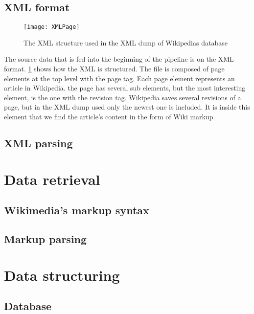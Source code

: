 \subsection{XML format}
\begin{figure}[h]
\caption{The XML structure used in the XML dump of Wikipedias database}
\texttt{[image: XMLPage]}
\label{fig:xml}
\end{figure}

The source data that is fed into the beginning of the pipeline is on the XML format. \ref{fig:xml} shows how the XML is structured. The file is composed of page elements at the top level with the page tag. Each page element represents an article in Wikipedia. the page has several sub elements, but the most interesting element, is the one with the revision tag. Wikipedia saves several revisions of a page, but in the XML dump used only the newest one is included. It is inside this element that we find the article's content in the form of Wiki markup.


\subsection{XML parsing}


\section{Data retrieval}

\subsection{Wikimedia's markup syntax}


\subsection{Markup parsing}


\section{Data structuring}

\subsection{Database}

